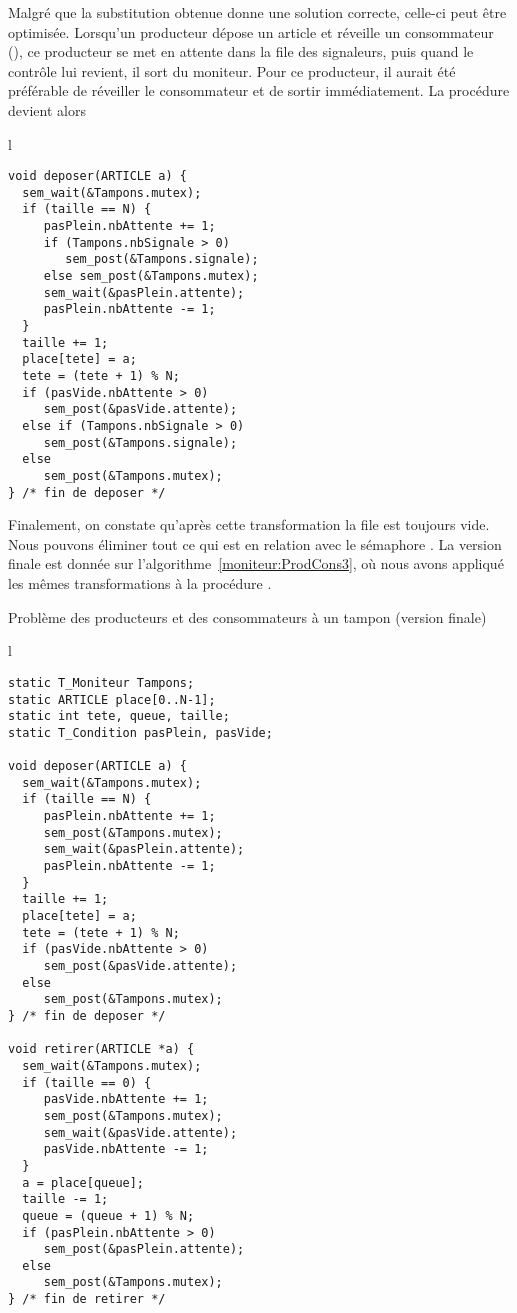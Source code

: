 Malgré que la substitution obtenue donne une solution correcte, celle-ci peut être optimisée. Lorsqu'un producteur dépose un article et réveille un consommateur (), ce producteur se met en attente dans la file des signaleurs, puis quand le contrôle lui revient, il sort du moniteur. Pour ce producteur, il aurait été préférable de réveiller le consommateur et de sortir immédiatement. La procédure  devient alors %
\begin{center}
\begin{tabular}{l}
\lstset{language=C++}
\begin{lstlisting}
void deposer(ARTICLE a) {
  sem_wait(&Tampons.mutex);
  if (taille == N) {
     pasPlein.nbAttente += 1;
     if (Tampons.nbSignale > 0)
        sem_post(&Tampons.signale);
     else sem_post(&Tampons.mutex);
     sem_wait(&pasPlein.attente);
     pasPlein.nbAttente -= 1;
  }
  taille += 1;
  place[tete] = a;
  tete = (tete + 1) % N;
  if (pasVide.nbAttente > 0)
     sem_post(&pasVide.attente);
  else if (Tampons.nbSignale > 0)
     sem_post(&Tampons.signale);
  else
     sem_post(&Tampons.mutex);
} /* fin de deposer */
\end{lstlisting}
\end{tabular}
\end{center}
Finalement, on constate qu'après cette transformation la file  est toujours vide. Nous pouvons éliminer tout ce qui est en relation avec le sémaphore . La version finale est donnée sur l'algorithme~\ref{moniteur:ProdCons3},  où nous avons appliqué les mêmes transformations à la procédure .

\begin{algorithm}[!ht]
\caption{Problème des producteurs et des consommateurs à un tampon (version finale)}\label{moniteur:ProdCons3}
\begin{center}
\begin{tabular}{l}
\lstset{language=C++}
\begin{lstlisting}
static T_Moniteur Tampons;
static ARTICLE place[0..N-1];
static int tete, queue, taille;
static T_Condition pasPlein, pasVide;

void deposer(ARTICLE a) {
  sem_wait(&Tampons.mutex);
  if (taille == N) {
     pasPlein.nbAttente += 1;
     sem_post(&Tampons.mutex);
     sem_wait(&pasPlein.attente);
     pasPlein.nbAttente -= 1;
  }
  taille += 1;
  place[tete] = a;
  tete = (tete + 1) % N;
  if (pasVide.nbAttente > 0)
     sem_post(&pasVide.attente);
  else
     sem_post(&Tampons.mutex);
} /* fin de deposer */

void retirer(ARTICLE *a) {
  sem_wait(&Tampons.mutex);
  if (taille == 0) {
     pasVide.nbAttente += 1;
     sem_post(&Tampons.mutex);
     sem_wait(&pasVide.attente);
     pasVide.nbAttente -= 1;
  }
  a = place[queue];
  taille -= 1;
  queue = (queue + 1) % N;
  if (pasPlein.nbAttente > 0)
     sem_post(&pasPlein.attente);
  else
     sem_post(&Tampons.mutex);
} /* fin de retirer */
\end{lstlisting}
\end{tabular}
\end{center}
\end{algorithm}

